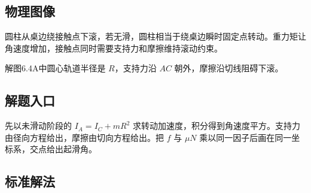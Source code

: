 \documentclass[UTF8,fontset=fandol,a4paper,11pt]{ctexart}
\begin{document}

\subsection*{物理图像}

圆柱从桌边绕接触点下滚，若无滑，圆柱相当于绕桌边瞬时固定点转动。重力矩让角速度增加，接触点同时需要支持力和摩擦维持滚动约束。

解图6.4A中圆心轨道半径是 $R$，支持力沿 $AC$ 朝外，摩擦沿切线阻碍下滚。



\subsection*{解题入口}

先以未滑动阶段的 $I_A=I_C+mR^2$ 求转动加速度，积分得到角速度平方。支持力由径向方程给出，摩擦由切向方程给出。把 $f$ 与 $\mu N$ 乘以同一因子后画在同一坐标系，交点给出起滑角。



\subsection*{标准解法}
\end{document}
